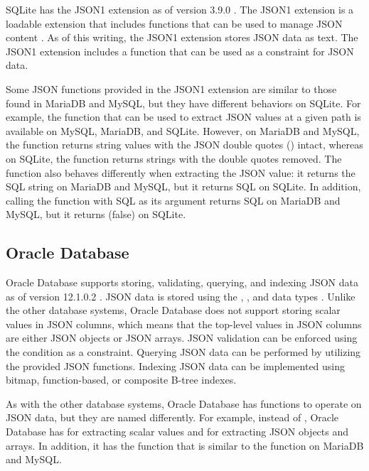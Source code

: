 SQLite has the JSON1 extension as of version 3.9.0 \cite{sqlite:3.9.0}. The
JSON1 extension is a loadable extension that includes functions that can be
used to manage JSON content \cite{sqlite:json1}. As of this writing, the JSON1
extension stores JSON data as text. The JSON1 extension includes a
 function that can be used as a  constraint for
JSON data.

Some JSON functions provided in the JSON1 extension are similar to those found
in MariaDB and MySQL, but they have different behaviors on SQLite. For example,
the  function that can be used to extract JSON values at a
given path is available on MySQL, MariaDB, and SQLite. However, on MariaDB and
MySQL, the function returns string values with the JSON double quotes
() intact, whereas on SQLite, the function returns strings with the
double quotes removed. The function also behaves differently when extracting
the JSON  value: it returns the SQL string  on
\mbox{MariaDB} and MySQL, but it returns SQL  on SQLite. In
addition, calling the  function with SQL  as its
argument returns SQL  on MariaDB and MySQL, but it returns 
(false) on SQLite.

\subsection{Oracle Database}

Oracle Database supports storing, validating, querying, and indexing JSON data
as of version 12.1.0.2 \cite{oracle:12.1.0.2}. JSON data is stored using the
, , and  data types \cite{oracle:json}.
Unlike the other database systems, Oracle Database does not support storing
scalar values in JSON columns, which means that the top-level values in JSON
columns are either JSON objects or JSON arrays. JSON validation can be enforced
using the  condition as a  constraint. Querying JSON
data can be performed by utilizing the provided JSON functions. Indexing JSON
data can be implemented using bitmap, function-based, or composite B-tree
indexes.

As with the other database systems, Oracle Database has functions to operate on
JSON data, but they are named differently. For example, instead of
, Oracle Database has  for extracting
scalar values and  for extracting JSON objects and arrays. In
addition, it has the  function that is similar to the
 function on MariaDB and MySQL.

